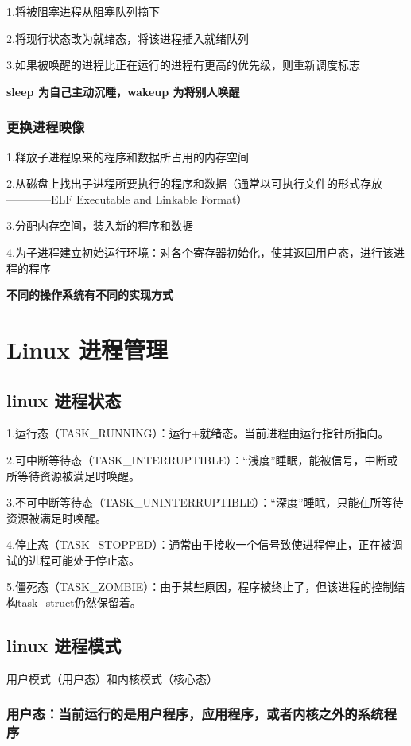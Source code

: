 \documentclass{ctexart}
\begin{document}
1.将被阻塞进程从阻塞队列摘下

2.将现行状态改为就绪态，将该进程插入就绪队列

3.如果被唤醒的进程比正在运行的进程有更高的优先级，则重新调度标志

\textbf{sleep 为自己主动沉睡，wakeup 为将别人唤醒}

\subsubsection{更换进程映像}

1.释放子进程原来的程序和数据所占用的内存空间

2.从磁盘上找出子进程所要执行的程序和数据（通常以可执行文件的形式存放————ELF Executable and Linkable Format）

3.分配内存空间，装入新的程序和数据

4.为子进程建立初始运行环境：对各个寄存器初始化，使其返回用户态，进行该进程的程序

\textbf{不同的操作系统有不同的实现方式}

\section{Linux 进程管理}
\subsection{linux 进程状态}

1.运行态（TASK\_RUNNING）：运行+就绪态。当前进程由运行指针所指向。

2.可中断等待态（TASK\_INTERRUPTIBLE）：“浅度”睡眠，能被信号，中断或所等待资源被满足时唤醒。

3.不可中断等待态（TASK\_UNINTERRUPTIBLE）：“深度”睡眠，只能在所等待资源被满足时唤醒。

4.停止态（TASK\_STOPPED）：通常由于接收一个信号致使进程停止，正在被调试的进程可能处于停止态。

5.僵死态（TASK\_ZOMBIE）：由于某些原因，程序被终止了，但该进程的控制结构task\_struct仍然保留着。

\subsection{linux 进程模式}
用户模式（用户态）和内核模式（核心态）
\subsubsection{用户态：当前运行的是用户程序，应用程序，或者内核之外的系统程序}
\end{document}
